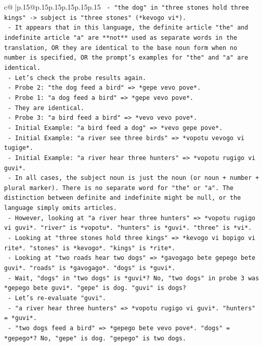 \documentclass{article}
\begin{document}
{\begin{supertabular}{c@{$\;$}|p{.15\linewidth}@{}p{.15\linewidth}p{.15\linewidth}p{.15\linewidth}p{.15\linewidth}p{.15\linewidth}}
{{{\texttt{  {-} "the dog" in "three stones hold three kings" {-}> subject is "three stones" (*kevogo vi*).} \\
\texttt{  {-} It appears that in this language, the definite article "the" and indefinite article "a" are **not** used as separate words in the translation, OR they are identical to the base noun form when no number is specified, OR the prompt's examples for "the" and "a" are identical.} \\
\texttt{  {-} Let's check the probe results again.} \\
\texttt{  {-} Probe 2: "the dog feed a bird" => *gepe vevo pove*.} \\
\texttt{  {-} Probe 1: "a dog feed a bird" => *gepe vevo pove*.} \\
\texttt{  {-} They are identical.} \\
\texttt{  {-} Probe 3: "a bird feed a bird" => *vevo vevo pove*.} \\
\texttt{  {-} Initial Example: "a bird feed a dog" => *vevo gepe pove*.} \\
\texttt{  {-} Initial Example: "a river see three birds" => *vopotu vevogo vi tugige*.} \\
\texttt{  {-} Initial Example: "a river hear three hunters" => *vopotu rugigo vi guvi*.} \\
\texttt{  {-} In all cases, the subject noun is just the noun (or noun + number + plural marker). There is no separate word for "the" or "a". The distinction between definite and indefinite might be null, or the language simply omits articles.} \\
\texttt{  {-} However, looking at "a river hear three hunters" => *vopotu rugigo vi guvi*. "river" is *vopotu*. "hunters" is *guvi*. "three" is *vi*.} \\
\texttt{  {-} Looking at "three stones hold three kings" => *kevogo vi bopigo vi rite*. "stones" is *kevogo*. "kings" is *rite*.} \\
\texttt{  {-} Looking at "two roads hear two dogs" => *gavogago bete gepego bete guvi*. "roads" is *gavogago*. "dogs" is *guvi*.} \\
\texttt{  {-} Wait, "dogs" in "two dogs" is *guvi*? No, "two dogs" in probe 3 was *gepego bete guvi*. "gepe" is dog. "guvi" is dogs?} \\
\texttt{  {-} Let's re{-}evaluate "guvi".} \\
\texttt{  {-} "a river hear three hunters" => *vopotu rugigo vi guvi*. "hunters" = *guvi*.} \\
\texttt{  {-} "two dogs feed a bird" => *gepego bete vevo pove*. "dogs" = *gepego*? No, "gepe" is dog. "gepego" is two dogs.} \\
}}}
\end{supertabular}}
\end{document}
